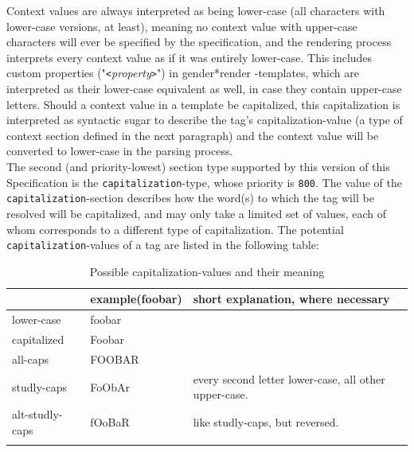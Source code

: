 \documentclass{article}
\newcommand{\GenderRender}{
    gender*render
}
\begin{document}
    Context values are always interpreted as being lower-case (all characters with lower-case versions, at least), meaning no context value with upper-case characters will ever be specified by the specification, and the rendering process interprets every context value as if it was entirely lower-case.
    This includes custom properties ("\texttt{<}\emph{property}\texttt{>}") in \GenderRender-templates, which are interpreted as their lower-case equivalent as well, in case they contain upper-case letters.
    Should a context value in a template be capitalized, this capitalization is interpreted as syntactic sugar to describe the tag's capitalization-value (a type of context section defined in the next paragraph) and the context value will be converted to lower-case in the parsing process.\\

    The second (and priority-lowest) section type supported by this version of this Specification is the \texttt{capitalization}-type, whose priority is \texttt{800}.
    The value of the \texttt{capitalization}-section describes how the word(s) to which the tag will be resolved will be capitalized, and may only take a limited set of values, each of whom corresponds to a different type of capitalization.
    The potential \texttt{capitalization}-values of a tag are listed in the following table:

    \begin{flushleft}
        \begin{center}
            \begin{longtable}{| >{\raggedright\arraybackslash}p{7em} | >{\raggedright\arraybackslash}p{4em} | >{\raggedright\arraybackslash}p{23em} |}
                \hline
                {value} & {example\linebreak (foobar)} & {short explanation, where necessary} \\
                \hline\hline
                lower-case & foobar & \\
                \hline
                capitalized & Foobar & \\
                \hline
                all-caps & FOOBAR & \\
                \hline
                studly-caps & FoObAr & every second letter lower-case, all other upper-case.\\
                \hline
                alt-studly-caps & fOoBaR & like studly-caps, but reversed.\\
                \hline
                \caption{Possible capitalization-values and their meaning}
            \end{longtable}
        \end{center}
    \end{flushleft}
\end{document}

